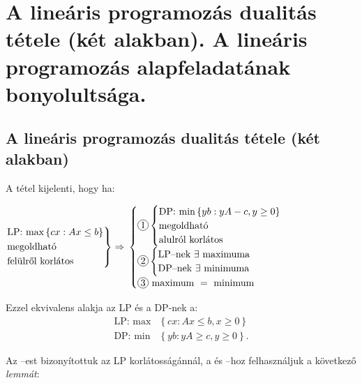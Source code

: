 ﻿\newpage
\section{A lineáris programozás dualitás tétele (két alakban). A lineáris programozás alapfeladatának bonyolultsága.}

\subsection{A lineáris programozás dualitás tétele (két alakban)}
A tétel kijelenti, hogy ha: 

$ \begin{rcases}
\mbox{LP: max}\left\{cx:Ax \leq b\right\} \\
\mbox{megoldható} \\
\mbox{felülről korlátos}
\end{rcases} \Rightarrow$ $\begin{cases}
\circled{1} \begin{cases}
\mbox{DP: min} \left\{ yb:yA - c, y \geq 0 \right\} \\
	\mbox{megoldható} \\ 
	\mbox{alulról korlátos}  
\end{cases} \\
\circled{2} \begin{cases}
\mbox{LP--nek } \exists \mbox{ maximuma} \\
\mbox{DP--nek } \exists \mbox{ minimuma} 
\end{cases}\\
\circled{3} \mbox{ maximum } = \mbox{ minimum}
\end{cases}$

Ezzel ekvivalens alakja az LP és a DP-nek a:
\begin{align*}
\mbox{LP: max} &\left\{ cx:Ax \leq b, x \geq 0 \right\} \\
\mbox{DP: min} &\left\{ yb:yA \geq c, y \geq 0 \right\}.
\end{align*}

Az --est bizonyítottuk az LP korlátosságánnál, a  és 
--hoz felhasználjuk a következő \emph{lemmát}:

